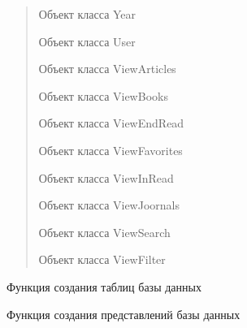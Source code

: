 \documentclass[letterpaper,10pt,russian]{sphinxmanual}
\begin{document}
\begin{fulllineitems}
\begin{description}
\begin{quote}
\begin{description}
\sphinxAtStartPar
Объект класса Year

\sphinxAtStartPar
Объект класса User

\sphinxAtStartPar
Объект класса ViewArticles

\sphinxAtStartPar
Объект класса ViewBooks

\sphinxAtStartPar
Объект класса ViewEndRead

\sphinxAtStartPar
Объект класса ViewFavorites

\sphinxAtStartPar
Объект класса ViewInRead

\sphinxAtStartPar
Объект класса ViewJoornals

\sphinxAtStartPar
Объект класса ViewSearch

\sphinxAtStartPar
Объект класса ViewFilter

\end{description}\end{quote}

\end{description}

\begin{fulllineitems}
\label{\detokenize{database.sqlite3_interface:database.sqlite3_interface.create_db.CreateDataBase.create_tables}}
\pysigstartsignatures
{}
\pysigstopsignatures
\sphinxAtStartPar
Функция создания таблиц базы данных

\end{fulllineitems}


\begin{fulllineitems}
\label{\detokenize{database.sqlite3_interface:database.sqlite3_interface.create_db.CreateDataBase.create_views}}
\pysigstartsignatures
{}
\pysigstopsignatures
\sphinxAtStartPar
Функция создания представлений базы данных


\end{fulllineitems}
\end{fulllineitems}
\end{document}
